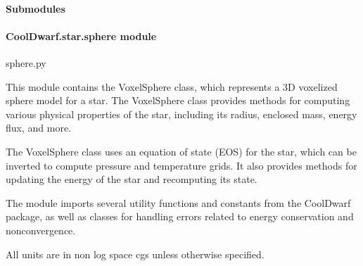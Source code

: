 \documentclass[letterpaper,10pt,english]{sphinxmanual}
\begin{document}
\paragraph{Submodules}
\label{\detokenize{CoolDwarf.star:submodules}}

\paragraph{CoolDwarf.star.sphere module}
\label{\detokenize{CoolDwarf.star:module-CoolDwarf.star.sphere}}\label{\detokenize{CoolDwarf.star:cooldwarf-star-sphere-module}}
\sphinxAtStartPar
sphere.py

\sphinxAtStartPar
This module contains the VoxelSphere class, which represents a 3D voxelized sphere model for a star. 
The VoxelSphere class provides methods for computing various physical properties of the star, 
including its radius, enclosed mass, energy flux, and more.

\sphinxAtStartPar
The VoxelSphere class uses an equation of state (EOS) for the star, which can be inverted to compute 
pressure and temperature grids. It also provides methods for updating the energy of the star and 
recomputing its state.

\sphinxAtStartPar
The module imports several utility functions and constants from the CoolDwarf package, 
as well as classes for handling errors related to energy conservation and non\sphinxhyphen{}convergence.

\sphinxAtStartPar
All units are in non log space cgs unless otherwise specified.
\end{document}
